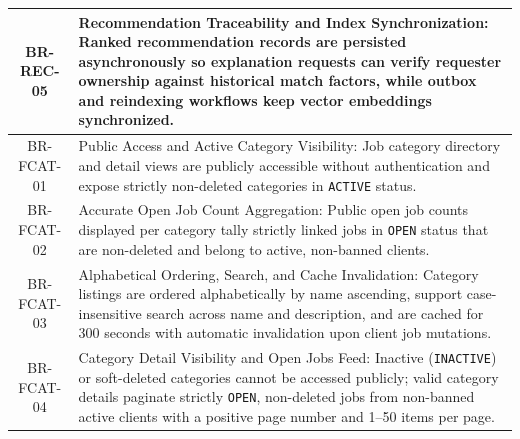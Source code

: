 \begin{longtable}{|c|p{12cm}|}
    BR-REC-05 & Recommendation Traceability and Index Synchronization: Ranked recommendation records are persisted asynchronously so explanation requests can verify requester ownership against historical match factors, while outbox and reindexing workflows keep vector embeddings synchronized. \\ \hline
    BR-FCAT-01 & Public Access and Active Category Visibility: Job category directory and detail views are publicly accessible without authentication and expose strictly non-deleted categories in \texttt{ACTIVE} status. \\ \hline
    BR-FCAT-02 & Accurate Open Job Count Aggregation: Public open job counts displayed per category tally strictly linked jobs in \texttt{OPEN} status that are non-deleted and belong to active, non-banned clients. \\ \hline
    BR-FCAT-03 & Alphabetical Ordering, Search, and Cache Invalidation: Category listings are ordered alphabetically by name ascending, support case-insensitive search across name and description, and are cached for 300 seconds with automatic invalidation upon client job mutations. \\ \hline
    BR-FCAT-04 & Category Detail Visibility and Open Jobs Feed: Inactive (\texttt{INACTIVE}) or soft-deleted categories cannot be accessed publicly; valid category details paginate strictly \texttt{OPEN}, non-deleted jobs from non-banned active clients with a positive page number and 1--50 items per page. \\ \hline

 


\end{longtable}
